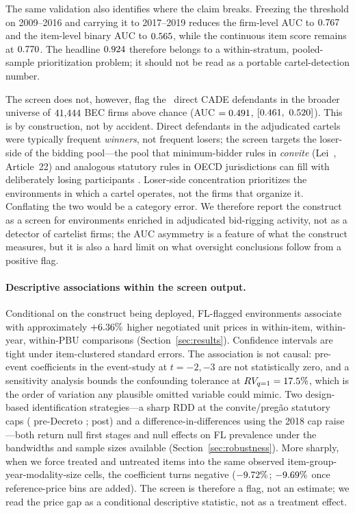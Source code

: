 The same validation also identifies where the claim breaks.
Freezing the threshold on 2009--2016 and carrying it to 2017--2019
reduces the firm-level AUC to $0.767$ and the
item-level binary AUC to $0.565$, while the
continuous item score remains at $0.770$. The
headline $0.924$ therefore belongs to a
within-stratum, pooled-sample prioritization problem; it
should not be read as a portable cartel-detection number.

The screen does not, however, flag the \valDirectCADE\ direct CADE
defendants in the broader universe of $41{,}444$ BEC firms
above chance (AUC $=0.491$, $[0.461,\ 0.520]$). This is by
construction, not by accident. Direct defendants in the
adjudicated cartels were typically frequent \emph{winners},
not frequent losers; the screen targets the loser-side of the
bidding pool---the pool that minimum-bidder rules in
\emph{convite} (Lei~\valLeiOriginal, Article~22) and analogous
statutory rules in OECD jurisdictions can fill with deliberately
losing participants \citep{marshall2012economics,
asker2010leniency,porter1993detection}. Loser-side
concentration prioritizes the environments in which a cartel
operates, not the firms that organize it. Conflating the two
would be a category error. We therefore report the
construct as a screen for environments enriched in
adjudicated bid-rigging activity, not as a detector of
cartelist firms; the AUC asymmetry is a feature of what the
construct measures, but it is also a hard limit on what
oversight conclusions follow from a positive flag.

\paragraph{Descriptive associations within the screen output.}
Conditional on the construct being deployed, FL-flagged
environments associate with approximately $+6.36\%$ higher
negotiated unit prices in within-item, within-year, within-PBU
comparisons (Section~\ref{sec:results}). Confidence
intervals are tight under item-clustered standard errors. The
association is not causal: pre-event coefficients in the
event-study at $t = -2, -3$ are not statistically zero, and a
\citet{cinelli2020making} sensitivity analysis bounds the
confounding tolerance at $RV_{q=1} = 17.5\%$, which is the
order of variation any plausible omitted variable could
mimic. Two design-based identification strategies---a sharp
RDD at the convite/pregão statutory caps (\valCapOldR
pre-Decreto \valDecreto; \valCapNewR post) and a
difference-in-differences using the 2018 cap raise---both
return null first stages and null effects on FL prevalence
under the bandwidths and sample sizes available
(Section~\ref{sec:robustness}). More sharply, when we force
treated and untreated items into the same observed
item-group-year-modality-size cells, the coefficient turns
negative ($-9.72\%$; $-9.69\%$
once reference-price bins are added). The screen is therefore a
flag, not an estimate; we read the price gap as a conditional
descriptive statistic, not as a treatment effect.

